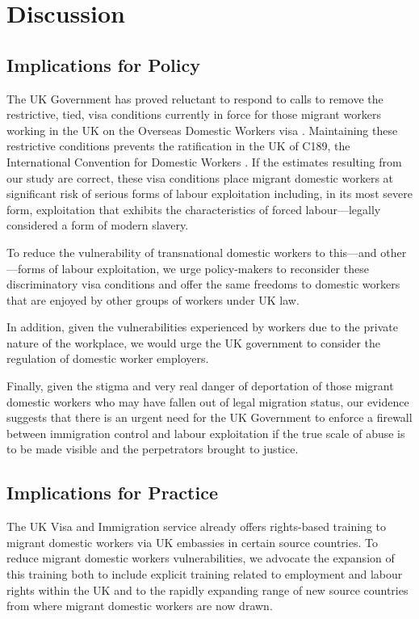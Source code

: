 \documentclass[
  12pt,
  letterpaper,
  DIV=11,
  numbers=noendperiod]{scrartcl}
\theoremstyle{plain}
\theoremstyle{definition}
\begin{document}
\section{Discussion}\label{discussion}

\subsection{Implications for Policy}\label{implications-for-policy}

The UK Government has proved reluctant to respond to calls to remove the
restrictive, tied, visa conditions currently in force for those migrant
workers working in the UK on the Overseas Domestic Workers visa
\autocite{gower_calls_2016}. Maintaining these restrictive conditions
prevents the ratification in the UK of C189, the International
Convention for Domestic Workers \autocite{ILO11-indicators}. If the
estimates resulting from our study are correct, these visa conditions
place migrant domestic workers at significant risk of serious forms of
labour exploitation including, in its most severe form, exploitation
that exhibits the characteristics of forced labour---legally considered
a form of modern slavery.

To reduce the vulnerability of transnational domestic workers to
this---and other---forms of labour exploitation, we urge policy-makers
to reconsider these discriminatory visa conditions and offer the same
freedoms to domestic workers that are enjoyed by other groups of workers
under UK law.

In addition, given the vulnerabilities experienced by workers due to the
private nature of the workplace, we would urge the UK government to
consider the regulation of domestic worker employers.

Finally, given the stigma and very real danger of deportation of those
migrant domestic workers who may have fallen out of legal migration
status, our evidence suggests that there is an urgent need for the UK
Government to enforce a firewall between immigration control and labour
exploitation if the true scale of abuse is to be made visible and the
perpetrators brought to justice.

\subsection{Implications for Practice}\label{implications-for-practice}

The UK Visa and Immigration service already offers rights-based training
to migrant domestic workers via UK embassies in certain source
countries. To reduce migrant domestic workers vulnerabilities, we
advocate the expansion of this training both to include explicit
training related to employment and labour rights within the UK and to
the rapidly expanding range of new source countries from where migrant
domestic workers are now drawn.
\end{document}
